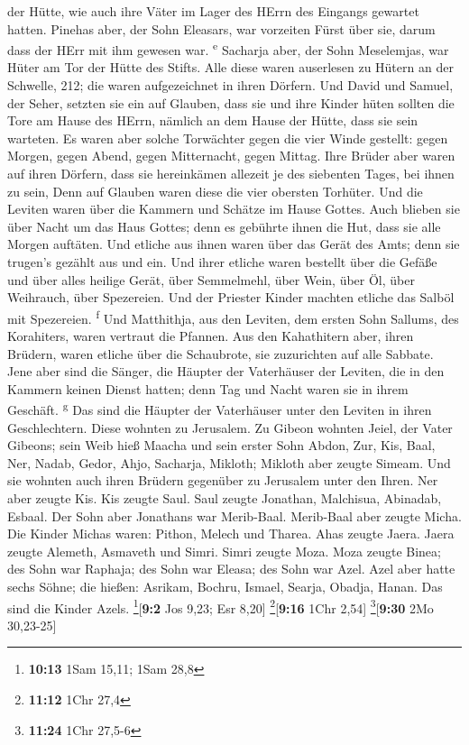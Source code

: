 der Hütte, wie auch ihre Väter im Lager des HErrn des Eingangs gewartet
hatten.  Pinehas aber, der Sohn Eleasars, war vorzeiten
Fürst über sie, darum dass der HErr mit ihm gewesen war.
\textsuperscript{e}  Sacharja aber, der Sohn Meselemjas,
war Hüter am Tor der Hütte des Stifts.  Alle diese waren
auserlesen zu Hütern an der Schwelle, 212; die waren aufgezeichnet in
ihren Dörfern. Und David und Samuel, der Seher, setzten sie ein auf
Glauben,  dass sie und ihre Kinder hüten sollten die Tore
am Hause des HErrn, nämlich an dem Hause der Hütte, dass sie sein
warteten.  Es waren aber solche Torwächter gegen die vier
Winde gestellt: gegen Morgen, gegen Abend, gegen Mitternacht, gegen
Mittag.  Ihre Brüder aber waren auf ihren Dörfern, dass
sie hereinkämen allezeit je des siebenten Tages, bei ihnen zu sein,
 Denn auf Glauben waren diese die vier obersten Torhüter.
Und die Leviten waren über die Kammern und Schätze im Hause Gottes.
 Auch blieben sie über Nacht um das Haus Gottes; denn es
gebührte ihnen die Hut, dass sie alle Morgen auftäten. 
Und etliche aus ihnen waren über das Gerät des Amts; denn sie trugen's
gezählt aus und ein.  Und ihrer etliche waren bestellt
über die Gefäße und über alles heilige Gerät, über Semmelmehl, über
Wein, über Öl, über Weihrauch, über Spezereien.  Und der
Priester Kinder machten etliche das Salböl mit Spezereien.
\textsuperscript{f}  Und Matthithja, aus den Leviten, dem
ersten Sohn Sallums, des Korahiters, waren vertraut die Pfannen.
 Aus den Kahathitern aber, ihren Brüdern, waren etliche
über die Schaubrote, sie zuzurichten auf alle Sabbate. 
Jene aber sind die Sänger, die Häupter der Vaterhäuser der Leviten, die
in den Kammern keinen Dienst hatten; denn Tag und Nacht waren sie in
ihrem Geschäft. \textsuperscript{g}  Das sind die Häupter
der Vaterhäuser unter den Leviten in ihren Geschlechtern. Diese wohnten
zu Jerusalem.  Zu Gibeon wohnten Jeiel, der Vater
Gibeons; sein Weib hieß Maacha  und sein erster Sohn
Abdon, Zur, Kis, Baal, Ner, Nadab,  Gedor, Ahjo,
Sacharja, Mikloth;  Mikloth aber zeugte Simeam. Und sie
wohnten auch ihren Brüdern gegenüber zu Jerusalem unter den Ihren.
 Ner aber zeugte Kis. Kis zeugte Saul. Saul zeugte
Jonathan, Malchisua, Abinadab, Esbaal.  Der Sohn aber
Jonathans war Merib-Baal. Merib-Baal aber zeugte Micha. 
Die Kinder Michas waren: Pithon, Melech und Tharea.  Ahas
zeugte Jaera. Jaera zeugte Alemeth, Asmaveth und Simri. Simri zeugte
Moza.  Moza zeugte Binea; des Sohn war Raphaja; des Sohn
war Eleasa; des Sohn war Azel.  Azel aber hatte sechs
Söhne; die hießen: Asrikam, Bochru, Ismael, Searja, Obadja, Hanan. Das
sind die Kinder Azels. \footnote{\textbf{10:13} 1Sam 15,11; 1Sam 28,8}{[}\textbf{9:2}
Jos 9,23; Esr 8,20{]} \footnote{\textbf{11:12} 1Chr 27,4}{[}\textbf{9:16}
1Chr 2,54{]} \footnote{\textbf{11:24} 1Chr 27,5-6}{[}\textbf{9:30} 2Mo
30,23-25{]}

